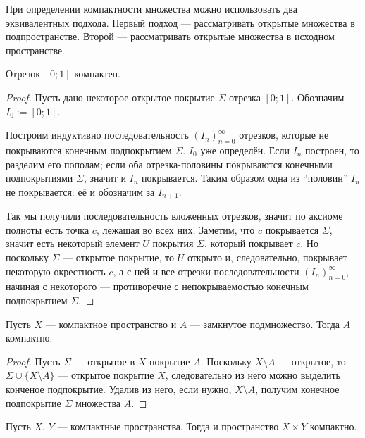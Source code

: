 \documentclass[12pt,a4paper]{article}
\begin{document}
    \begin{remark*}
        При определении компактности множества можно использовать два эквивалентных подхода. Первый подход --- рассматривать открытые множества в подпространстве. Второй --- рассматривать открытые множества в исходном пространстве.
    \end{remark*}

    \begin{theorem}
        Отрезок $[0; 1]$ компактен.
    \end{theorem}

    \begin{proof}
        Пусть дано некоторое открытое покрытие $\Sigma$ отрезка $[0; 1]$. Обозначим $I_0 := [0; 1]$.

        Построим индуктивно последовательность $(I_n)_{n=0}^\infty$ отрезков, которые не покрываются конечным подпокрытием $\Sigma$. $I_0$ уже определён. Если $I_n$ построен, то разделим его пополам; если оба отрезка-половины покрываются конечными подпокрытиями $\Sigma$, значит и $I_n$ покрывается. Таким образом одна из ``половин'' $I_n$ не покрывается: её и обозначим за $I_{n+1}$.

        Так мы получили последовательность вложенных отрезков, значит по аксиоме полноты есть точка $c$, лежащая во всех них. Заметим, что $c$ покрывается $\Sigma$, значит есть некоторый элемент $U$ покрытия $\Sigma$, который покрывает $c$. Но поскольку $\Sigma$ --- открытое покрытие, то $U$ открыто и, следовательно, покрывает некоторую окрестность $c$, а с ней и все отрезки последовательности $(I_n)_{n=0}^\infty$, начиная с некоторого --- противоречие с непокрываемостью конечным подпокрытием $\Sigma$.
    \end{proof}

    \begin{theorem}
        Пусть $X$ --- компактное пространство и $A$ --- замкнутое подмножество. Тогда $A$ компактно.
    \end{theorem}

    \begin{proof}
        Пусть $\Sigma$ --- открытое в $X$ покрытие $A$. Поскольку $X \setminus A$ --- открытое, то $\Sigma \cup \{X \setminus A\}$ --- открытое покрытие $X$, следовательно из него можно выделить конченое подпокрытие. Удалив из него, если нужно, $X \setminus A$, получим конечное подпокрытие $\Sigma$ множества $A$.
    \end{proof}

    \begin{theorem}
        Пусть $X$, $Y$ --- компактные пространства. Тогда и пространство $X \times Y$ компактно.
    \end{theorem}
\end{document}
